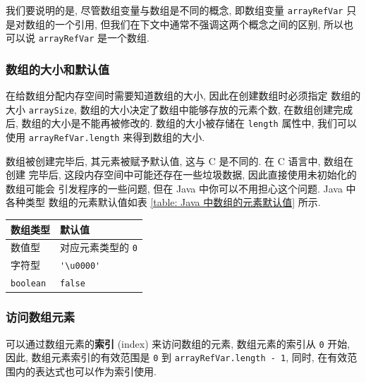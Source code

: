 \documentclass[10pt,UTF8]{book} %
\begin{document}
我们要说明的是, 尽管数组变量与数组是不同的概念, 即数组变量 \lstinline|arrayRefVar|
只是对数组的一个引用, 但我们在下文中通常不强调这两个概念之间的区别,
所以也可以说 \lstinline|arrayRefVar| 是一个数组.

\subsubsection{数组的大小和默认值}

在给数组分配内存空间时需要知道数组的大小, 因此在创建数组时必须指定
数组的大小 \lstinline|arraySize|, {\kaishu 数组的大小决定了数组中能够存放的元素个数,
在数组创建完成后, 数组的大小是不能再被修改的}. 数组的大小被存储在
\lstinline|length| 属性中, 我们可以使用 \lstinline|arrayRefVar.length|
来得到数组的大小.

数组被创建完毕后, 其元素被赋予默认值, 这与 C 是不同的. 在 C 语言中, 数组在创建
完毕后, 这段内存空间中可能还存在一些垃圾数据, 因此直接使用未初始化的数组可能会
引发程序的一些问题, 但在 Java 中你可以不用担心这个问题. Java 中各种类型
数组的元素默认值如表 \ref{table: Java 中数组的元素默认值} 所示.

{ %
\label{table: Java 中数组的元素默认值} %
\begin{longtable}{p{7em}p{10em}}
    \hline
    \textbf{数组类型} & \textbf{默认值} \\
    \hline
    \endhead
    \hline
    \endfoot

    数值型 & 对应元素类型的 \lstinline|0| \\ 
    字符型 & \lstinline|'\u0000'| \\ 
    \lstinline|boolean| & \lstinline|false| \\
\end{longtable}}

\subsubsection{访问数组元素}

{\kaishu 可以通过数组元素的\textbf{索引} (index) 来访问数组的元素},
数组元素的索引从 \lstinline|0| 开始, 因此, 数组元素索引的有效范围是
\lstinline|0| 到 \lstinline|arrayRefVar.length - 1|,
同时, 在有效范围内的表达式也可以作为索引使用.
\end{document}

